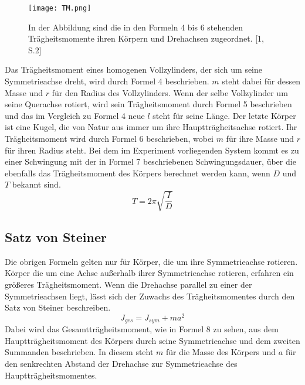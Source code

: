 \documentclass[titlepage = firstcover]{scrartcl}
\begin{document}
      \begin{figure}[h]
        \centering
        \texttt{[image: TM.png]}
        \caption{In der Abbildung sind die in den Formeln 4 bis 6 stehenden Trägheitsmomente ihren Körpern und Drehachsen zugeordnet. [1, S.2]}
      \end{figure}
      Das Trägheitsmoment eines homogenen  Vollzylinders, der sich um seine Symmetrieachse dreht, wird durch Formel 4 beschrieben. $m$ steht dabei für dessen
      Masse und $r$ für den Radius des Vollzylinders. Wenn der selbe Vollzylinder um seine Querachse rotiert, wird sein Trägheitsmoment durch Formel 5 beschrieben 
      und das im Vergleich zu Formel 4 neue $l$ steht für seine Länge. Der letzte Körper ist eine Kugel, die von Natur aus immer um ihre Hauptträgheitsachse 
      rotiert. Ihr Trägheitsmoment wird durch Formel 6 beschrieben, wobei $m$ für ihre Masse und $r$ für ihren Radius steht. Bei dem im Experiment vorliegenden System
      kommt es zu einer Schwingung mit der in Formel 7 beschriebenen Schwingungsdauer, über die ebenfalls das Trägheitsmoment des Körpers berechnet werden kann, wenn
      $D$ und $T$ bekannt sind.
      \begin{equation}
        T = 2\pi \sqrt{\frac{I}{D}}
      \end{equation}

      \subsection{Satz von Steiner}
      Die obrigen Formeln gelten nur für Körper, die um ihre Symmetrieachse rotieren. Körper die um eine Achse außerhalb ihrer Symmetrieachse rotieren, erfahren
      ein größeres Trägheitsmoment. Wenn die Drehachse parallel zu einer der Symmetrieachsen liegt, lässt sich der Zuwachs des Trägheitsmomentes durch den Satz 
      von Steiner beschreiben. 
      \begin{equation}
        J_{ges} = J_{sym} + ma^2
      \end{equation}
      Dabei wird das Gesamtträgheitsmoment, wie in Formel 8 zu sehen, aus dem Hauptträgheitsmoment des Körpers durch seine Symmetrieachse und dem zweiten 
      Summanden beschrieben. In diesem steht $m$ für die Masse des Körpers und $a$ für den senkrechten Abstand der Drehachse zur Symmetrieachse des
      Hauptträgheitsmomentes.
\end{document}
